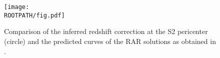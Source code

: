 \begin{figure}%
	\centering%
	\texttt{[image: \\ROOTPATH/fig.pdf]}
	\caption{Comparison of the inferred redshift correction at the S2 pericenter (circle) and the predicted curves of the RAR solutions as obtained in \citet{arguelles_novel_2018}.}%
	\label{fig:redshift}%
\end{figure}